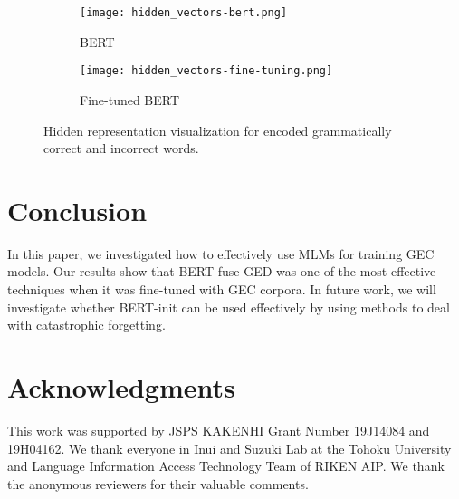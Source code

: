 \documentclass[11pt,a4paper]{article}
\begin{document}
\begin{figure}[t]
\begin{subfigure}[b]{0.237\textwidth}
\texttt{[image: hidden\_vectors-bert.png]}
    \caption{BERT}
    \label{fig:bert_fuse}
  \end{subfigure}
  \hfill
  \begin{subfigure}[b]{0.237\textwidth}
\texttt{[image: hidden\_vectors-fine-tuning.png]}
    \caption{Fine-tuned BERT}
    \label{fig:ft_bert_fuse}
  \end{subfigure}\hfill
  \caption{Hidden representation visualization for encoded grammatically correct and incorrect words. }\label{fig:vizualization}
\vspace{-1.5mm}
\end{figure}


\begin{table}[t]
\centering
{}
\caption{The result of single Fine-tuned BERT-fuse and w/o BERT models without using pseudo-data on most error types including all the top-5 frequent types of error in W\&I-dev}
\label{tab:err_type}
\end{table}



\section{Conclusion}

In this paper, we investigated how to effectively use MLMs for training GEC models.
Our results show that BERT-fuse GED was one of the most effective techniques when it was fine-tuned with GEC corpora.
In future work, we will investigate whether BERT-init can be used effectively by using methods to deal with catastrophic forgetting.

\section*{Acknowledgments}
This work was supported by JSPS KAKENHI Grant Number 19J14084 and 19H04162.
We thank everyone in Inui and Suzuki Lab at the Tohoku University and Language Information Access Technology Team of RIKEN AIP.
We thank the anonymous reviewers for their valuable comments.



\end{document}
